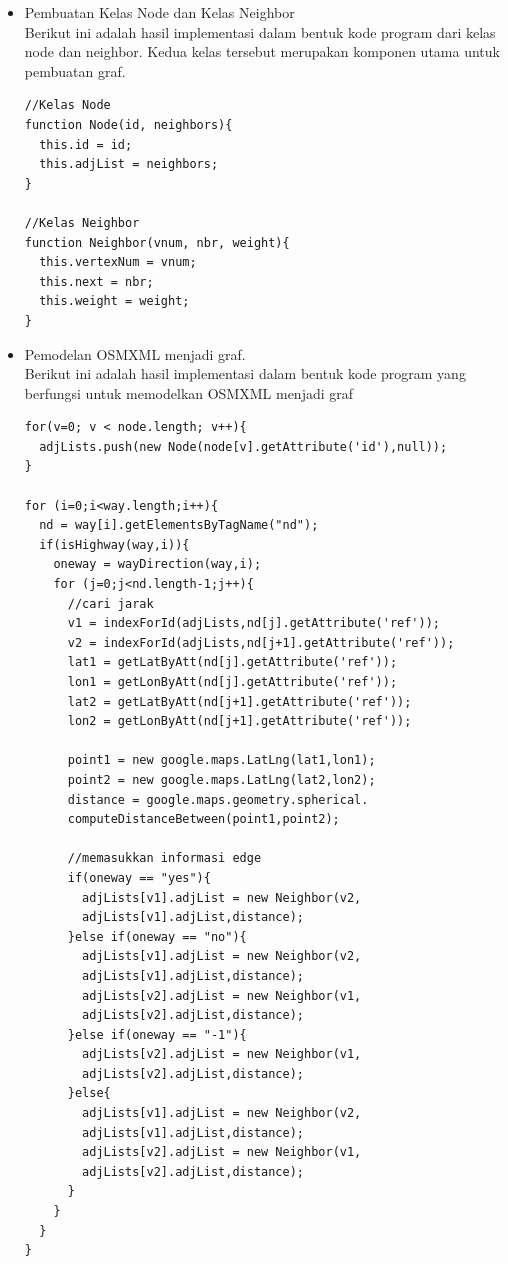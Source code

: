 \begin{itemize}
  \item Pembuatan Kelas Node dan Kelas Neighbor \\
  Berikut ini adalah hasil implementasi dalam bentuk kode program dari kelas
  node dan neighbor. Kedua kelas tersebut merupakan komponen utama untuk
  pembuatan graf.
\lstset{basicstyle=\scriptsize}
\begin{lstlisting}
//Kelas Node
function Node(id, neighbors){
  this.id = id;
  this.adjList = neighbors;
}

//Kelas Neighbor
function Neighbor(vnum, nbr, weight){
  this.vertexNum = vnum;
  this.next = nbr;
  this.weight = weight;
}
\end{lstlisting}
  
  \item Pemodelan OSMXML menjadi graf. \\
  Berikut ini adalah hasil implementasi dalam bentuk kode program yang berfungsi
  untuk memodelkan OSMXML menjadi graf
\begin{lstlisting}
for(v=0; v < node.length; v++){
  adjLists.push(new Node(node[v].getAttribute('id'),null));
}

for (i=0;i<way.length;i++){
  nd = way[i].getElementsByTagName("nd");
  if(isHighway(way,i)){
    oneway = wayDirection(way,i);
    for (j=0;j<nd.length-1;j++){
      //cari jarak 
      v1 = indexForId(adjLists,nd[j].getAttribute('ref'));
      v2 = indexForId(adjLists,nd[j+1].getAttribute('ref'));	
      lat1 = getLatByAtt(nd[j].getAttribute('ref'));
      lon1 = getLonByAtt(nd[j].getAttribute('ref'));
      lat2 = getLatByAtt(nd[j+1].getAttribute('ref'));
      lon2 = getLonByAtt(nd[j+1].getAttribute('ref'));
      
      point1 = new google.maps.LatLng(lat1,lon1);
      point2 = new google.maps.LatLng(lat2,lon2);
      distance = google.maps.geometry.spherical.
      computeDistanceBetween(point1,point2);
	  
      //memasukkan informasi edge		
      if(oneway == "yes"){
        adjLists[v1].adjList = new Neighbor(v2,
        adjLists[v1].adjList,distance); 
      }else if(oneway == "no"){
        adjLists[v1].adjList = new Neighbor(v2,
        adjLists[v1].adjList,distance); 
        adjLists[v2].adjList = new Neighbor(v1,
        adjLists[v2].adjList,distance);
      }else if(oneway == "-1"){
        adjLists[v2].adjList = new Neighbor(v1,
        adjLists[v2].adjList,distance); 
      }else{
        adjLists[v1].adjList = new Neighbor(v2,
        adjLists[v1].adjList,distance); 
        adjLists[v2].adjList = new Neighbor(v1,
        adjLists[v2].adjList,distance); 
      }	
    }
  }
}
\end{lstlisting}


\end{itemize}
